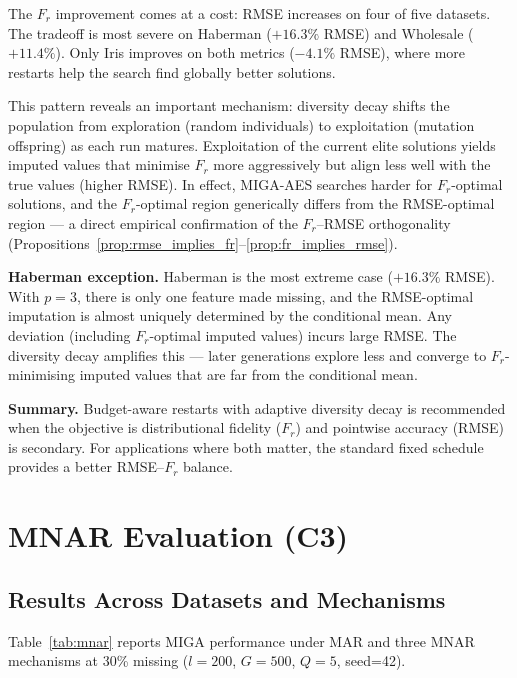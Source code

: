 The $F_r$ improvement comes at a cost: RMSE increases on four of five datasets. The tradeoff is most severe on Haberman ($+16.3\%$ RMSE) and Wholesale ($+11.4\%$). Only Iris improves on both metrics ($-4.1\%$ RMSE), where more restarts help the search find globally better solutions.

This pattern reveals an important mechanism: diversity decay shifts the population from exploration (random individuals) to exploitation (mutation offspring) as each run matures. Exploitation of the current elite solutions yields imputed values that minimise $F_r$ more aggressively but align less well with the true values (higher RMSE). In effect, MIGA-AES searches harder for $F_r$-optimal solutions, and the $F_r$-optimal region generically differs from the RMSE-optimal region --- a direct empirical confirmation of the $F_r$--RMSE orthogonality (Propositions~\ref{prop:rmse_implies_fr}--\ref{prop:fr_implies_rmse}).

\textbf{Haberman exception.} Haberman is the most extreme case ($+16.3\%$ RMSE). With $p=3$, there is only one feature made missing, and the RMSE-optimal imputation is almost uniquely determined by the conditional mean. Any deviation (including $F_r$-optimal imputed values) incurs large RMSE. The diversity decay amplifies this --- later generations explore less and converge to $F_r$-minimising imputed values that are far from the conditional mean.

\textbf{Summary.} Budget-aware restarts with adaptive diversity decay is recommended when the objective is distributional fidelity ($F_r$) and pointwise accuracy (RMSE) is secondary. For applications where both matter, the standard fixed schedule provides a better RMSE--$F_r$ balance.


\section{MNAR Evaluation (C3)}

\subsection{Results Across Datasets and Mechanisms}

Table~\ref{tab:mnar} reports MIGA performance under MAR and three MNAR mechanisms at 30\% missing ($l=200$, $G=500$, $Q=5$, seed=42).


